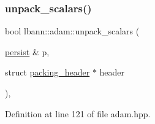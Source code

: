 \subsubsection{\texorpdfstring{unpack\+\_\+scalars()}{unpack\_scalars()}}
{\footnotesize\ttfamily bool lbann\+::adam\+::unpack\+\_\+scalars (\begin{DoxyParamCaption}\item[{\hyperlink{classlbann_1_1persist}{persist} \&}]{p,  }\item[{struct \hyperlink{structlbann_1_1adam_1_1packing__header}{packing\+\_\+header} $\ast$}]{header }\end{DoxyParamCaption})\hspace{0.3cm}{\ttfamily [inline]}, {\ttfamily [private]}}



Definition at line 121 of file adam.\+hpp.


